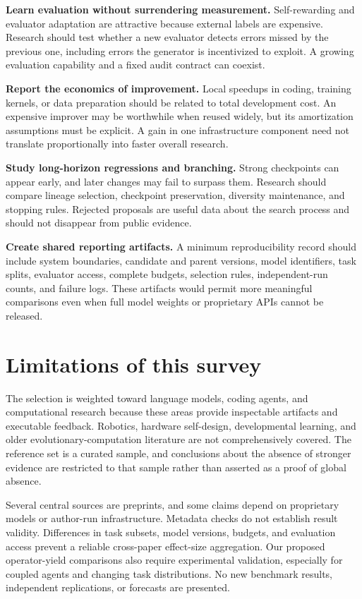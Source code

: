\documentclass[11pt,american,]{article}
\begin{document}
\textbf{Learn evaluation without surrendering measurement.}
Self-rewarding and evaluator adaptation are attractive because external
labels are expensive. Research should test whether a new evaluator
detects errors missed by the previous one, including errors the
generator is incentivized to exploit. A growing evaluation capability
and a fixed audit contract can coexist.

\textbf{Report the economics of improvement.} Local speedups in coding,
training kernels, or data preparation should be related to total
development cost. An expensive improver may be worthwhile when reused
widely, but its amortization assumptions must be explicit. A gain in one
infrastructure component need not translate proportionally into faster
overall research.

\textbf{Study long-horizon regressions and branching.} Strong
checkpoints can appear early, and later changes may fail to surpass
them. Research should compare lineage selection, checkpoint
preservation, diversity maintenance, and stopping rules. Rejected
proposals are useful data about the search process and should not
disappear from public evidence.

\textbf{Create shared reporting artifacts.} A minimum reproducibility
record should include system boundaries, candidate and parent versions,
model identifiers, task splits, evaluator access, complete budgets,
selection rules, independent-run counts, and failure logs. These
artifacts would permit more meaningful comparisons even when full model
weights or proprietary APIs cannot be released.

\hypertarget{limitations-of-this-survey}{%
\section{Limitations of this survey}\label{limitations-of-this-survey}}

The selection is weighted toward language models, coding agents, and
computational research because these areas provide inspectable artifacts
and executable feedback. Robotics, hardware self-design, developmental
learning, and older evolutionary-computation literature are not
comprehensively covered. The reference set is a curated sample, and
conclusions about the absence of stronger evidence are restricted to
that sample rather than asserted as a proof of global absence.

Several central sources are preprints, and some claims depend on
proprietary models or author-run infrastructure. Metadata checks do not
establish result validity. Differences in task subsets, model versions,
budgets, and evaluation access prevent a reliable cross-paper
effect-size aggregation. Our proposed operator-yield comparisons also
require experimental validation, especially for coupled agents and
changing task distributions. No new benchmark results, independent
replications, or forecasts are presented.
\end{document}
